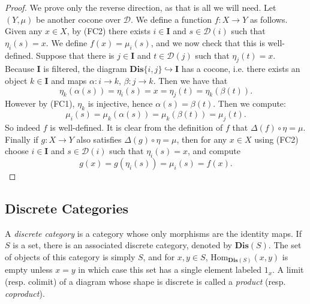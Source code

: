 \documentclass[oneside,11pt]{amsart}
\newcommand{\bI}{\ensuremath{\textbf{I}}}
\newcommand{\bDis}{\ensuremath{\textbf{Dis}}}
\newcommand{\mD}{\ensuremath{\mathcal{D}}}
\newcommand{\Hom}{\ensuremath{\text{Hom}}}
\theoremstyle{definition}
\newtheorem{proof techniques}{Proof Techniques}
\begin{document}
\begin{proof}


We prove only the reverse direction, as that is all we will need. Let $(Y ,\mu)$ be another cocone over $\mD$. We define a function $f: X \to Y$ as follows. Given any $x \in X$, by (FC2) there exists $i \in \bI$ and $s \in \mD(i)$ such that $\eta_i(s) = x$. We define $f(x) = \mu_i(s)$, and we now check that this is well-defined. Suppose that there is $j \in \bI$ and $t \in \mD(j)$ such that $\eta_j(t) = x$. Because $\bI$ is filtered, the diagram $\bDis\{ i , j \} \hookrightarrow \bI$ has a cocone, i.e. there exists an object $k \in \bI$ and maps $\alpha : i \to k$, $\beta : j \to k$. Then we have that 
\begin{equation*}
\eta_k(\alpha(s)) = \eta_i(s) = x =  \eta_j(t) = \eta_k(\beta(t)).
\end{equation*}
However by (FC1), $\eta_k$ is injective, hence $\alpha(s) = \beta(t)$. Then we compute:
\begin{equation*}
\mu_i(s) = \mu_k(\alpha(s)) = \mu_k(\beta(t)) = \mu_j(t). 
\end{equation*}
So indeed $f$ is well-defined. It is clear from the definition of $f$ that $\Delta(f) \circ \eta = \mu$. Finally if $g : X \to Y$ also satisfies $\Delta(g) \circ \eta = \mu$, then for any $x \in X$ using (FC2) choose $i \in \bI$ and $s \in \mD(i)$ such that $\eta_i(s) = x$, and compute 
\begin{equation*}
g(x) = g(\eta_i(s)) = \mu_i(s) = f(x). 
\end{equation*}
\end{proof}



\subsection{Discrete Categories} 

A \emph{discrete category} is a category whose only morphisms are the identity maps. If $S$ is a set, there is an associated discrete category, denoted by $\bDis(S)$. The set of objects of this category is simply $S$, and for $x , y \in S$, $\Hom_{\bDis(S)}(x , y)$ is empty unless $x = y$ in which case this set has a single element labeled $1_x$. A limit (resp. colimit) of a diagram whose shape is discrete is called a \emph{product} (resp. \emph{coproduct}). 

\end{document}
